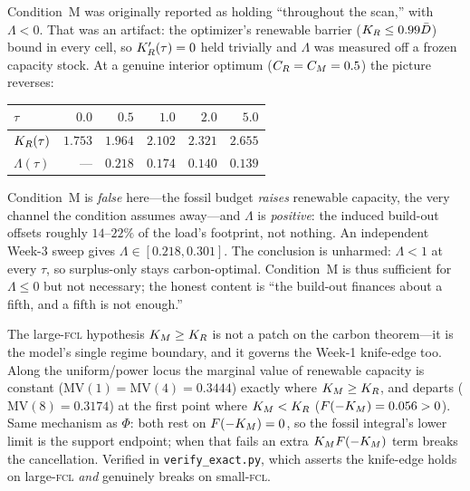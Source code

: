 \begin{remark}
\label{r1w4-rem:condMfails}
Condition~M was originally reported as holding ``throughout the scan,'' with $\Lambda<0$. That
was an artifact: the optimizer's renewable barrier ($K_R\le0.99\bar D$) bound in every cell, so
$K_R'(\tau)=0$ held trivially and $\Lambda$ was measured off a frozen capacity stock. At a
genuine interior optimum ($C_R=C_M=0.5$) the picture reverses:
\begin{center}\small
\begin{tabular}{lrrrrr}
\toprule
$\tau$ & $0.0$ & $0.5$ & $1.0$ & $2.0$ & $5.0$\\
\midrule
$K_R(\tau)$ & $1.753$ & $1.964$ & $2.102$ & $2.321$ & $2.655$\\
$\Lambda(\tau)$ & --- & $0.218$ & $0.174$ & $0.140$ & $0.139$\\
\bottomrule
\end{tabular}
\end{center}
Condition~M is \emph{false} here---the fossil budget \emph{raises} renewable capacity, the very
channel the condition assumes away---and $\Lambda$ is \emph{positive}: the induced build-out
offsets roughly $14$--$22\%$ of the load's footprint, not nothing. An independent Week-3 sweep
gives $\Lambda\in[0.218,0.301]$. The conclusion is unharmed: $\Lambda<1$ at every $\tau$, so
surplus-only stays carbon-optimal. Condition~M is thus sufficient for $\Lambda\le0$ but not
necessary; the honest content is ``the build-out finances about a fifth, and a fifth is not
enough.''
\end{remark}

\begin{remark}\label{r1w4-rem:oneboundary}
The large-\textsc{fcl} hypothesis $K_M\ge K_R$ is not a patch on the carbon theorem---it is the
model's single regime boundary, and it governs the Week-1 knife-edge too. Along the
uniform/power locus the marginal value of renewable capacity is constant
($\mathrm{MV}(1)=\mathrm{MV}(4)=0.3444$) exactly where $K_M\ge K_R$, and departs
($\mathrm{MV}(8)=0.3174$) at the first point where $K_M<K_R$ ($F(-K_M)=0.056>0$). Same
mechanism as $\Phi$: both rest on $F(-K_M)=0$, so the fossil integral's lower limit is the
support endpoint; when that fails an extra $K_M F(-K_M)$ term breaks the cancellation. Verified
in \texttt{verify\_exact.py}, which asserts the knife-edge holds on large-\textsc{fcl}
\emph{and} genuinely breaks on small-\textsc{fcl}.
\end{remark}

